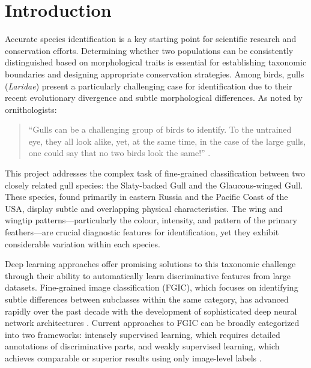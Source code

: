 

\section*{Introduction}

Accurate
\cite{source3}
 species identification is a key starting point for scientific research and conservation efforts. Determining whether two populations can be consistently distinguished based on morphological traits is essential for establishing taxonomic boundaries and designing appropriate conservation strategies. Among birds, gulls (\textit{Laridae}) present a particularly challenging case for identification due to their recent evolutionary divergence and subtle morphological differences. As noted by ornithologists:

\begin{quote}
    ``Gulls can be a challenging group of birds to identify. To the untrained eye, they all look alike, yet, at the same time, in the case of the large gulls, one could say that no two birds look the same!'' \cite{ayyash2024}.
\end{quote}

This project addresses the complex task of fine-grained classification between two closely related gull species: the Slaty-backed Gull and the Glaucous-winged Gull. These species, found primarily in eastern Russia and the Pacific Coast of the USA, display subtle and overlapping physical characteristics. The wing and wingtip patterns—particularly the colour, intensity, and pattern of the primary feathers—are crucial diagnostic features for identification, yet they exhibit considerable variation within each species.

Deep learning approaches offer promising solutions to this taxonomic challenge through their ability to automatically learn discriminative features from large datasets. Fine-grained image classification (FGIC), which focuses on identifying subtle differences between subclasses within the same category, has advanced rapidly over the past decade with the development of sophisticated deep neural network architectures \cite{karpathy2015}. Current approaches to FGIC can be broadly categorized into two frameworks: intensely supervised learning, which requires detailed annotations of discriminative parts, and weakly supervised learning, which achieves comparable or superior results using only image-level labels \cite{zhou2016}.


